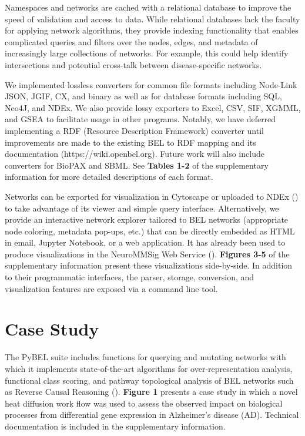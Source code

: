 \documentclass{bioinfo}
\begin{document}
Namespaces and networks are cached with a relational database to improve the speed of validation and access to data. While relational databases lack the faculty for applying network algorithms, they provide indexing functionality that enables complicated queries and filters over the nodes, edges, and metadata of increasingly large collections of networks. For example, this could help identify intersections and potential cross-talk between disease-specific networks. 

We implemented lossless converters for common file formats including Node-Link JSON, JGIF, CX, and binary as well as for database formats including SQL, Neo4J, and NDEx. We also provide lossy exporters to Excel, CSV, SIF, XGMML, and GSEA to facilitate usage in other programs. Notably, we have deferred implementing a RDF (Resource Description Framework) converter until improvements are made to the existing BEL to RDF mapping and its documentation (https://wiki.openbel.org). Future work will also include converters for BioPAX and SBML. See \textbf{Tables 1-2} of the supplementary information for more detailed descriptions of each format.  

Networks can be exported for visualization in Cytoscape or uploaded to NDEx (\citealp{Pratt2015}) to take advantage of its viewer and simple query interface. Alternatively, we provide an interactive network explorer tailored to BEL networks (appropriate node coloring, metadata pop-ups, etc.) that can be directly embedded as HTML in email, Jupyter Notebook, or a web application. It has already been used to produce visualizations in the NeuroMMSig Web Service (\citealp{Domingo-Fernandez2017}). \textbf{Figures 3-5} of the supplementary information present these visualizations side-by-side. In addition to their programmatic interfaces, the parser, storage, conversion, and visualization features are exposed via a command line tool.

\section{Case Study}

The PyBEL suite includes functions for querying and mutating networks with which it implements state-of-the-art algorithms for over-representation analysis, functional class scoring, and pathway topological analysis of BEL networks such as Reverse Causal Reasoning (\citealp{Catlett2013}). \textbf{Figure 1} presents a case study in which a novel heat diffusion work flow was used to assess the observed impact on biological processes from differential gene expression in Alzheimer's disease (AD). Technical documentation is included in the supplementary information.
\end{document}
